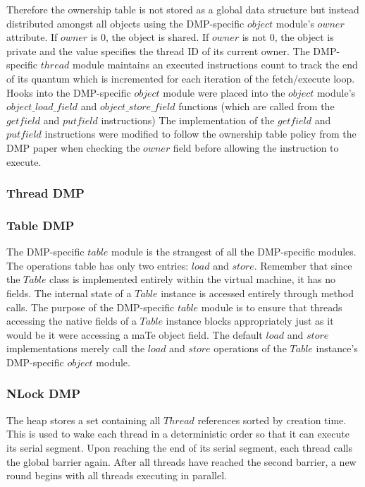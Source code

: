 Therefore the ownership table is not stored as a global data structure
but instead distributed amongst all objects using the DMP-specific
$object$ module's $owner$ attribute.  If $owner$ is $0$, the object is
shared.  If $owner$ is not $0$, the object is private and the value
specifies the thread ID of its current owner.  The DMP-specific
$thread$ module maintains an executed instructions count to track the
end of its quantum which is incremented for each iteration of the
fetch/execute loop.  Hooks into the DMP-specific $object$ module were
placed into the $object$ module's $object\_load\_field$ and
$object\_store\_field$ functions (which are called from the $getfield$
and $putfield$ instructions) The implementation of the $getfield$ and
$putfield$ instructions were modified to follow the ownership table
policy from the DMP paper when checking the $owner$ field before
allowing the instruction to execute.

\subsubsection{Thread DMP}

\subsubsection{Table DMP}

The DMP-specific $table$ module is the strangest of all the
DMP-specific modules.  The operations table has only two entries:
$load$ and $store$.  Remember that since the $Table$ class is
implemented entirely within the virtual machine, it has no fields.
The internal state of a $Table$ instance is accessed entirely through
method calls.  The purpose of the DMP-specific $table$ module is to
ensure that threads accessing the native fields of a $Table$ instance
blocks appropriately just as it would be it were accessing a maTe
object field.  The default $load$ and $store$ implementations merely
call the $load$ and $store$ operations of the $Table$ instance's
DMP-specific $object$ module.

\subsubsection{NLock DMP}

The heap stores a set containing all $Thread$ references sorted by
creation time.  This is used to wake each thread in a deterministic
order so that it can execute its serial segment.  Upon reaching the
end of its serial segment, each thread calls the global barrier again.
After all threads have reached the second barrier, a new round begins
with all threads executing in parallel.

